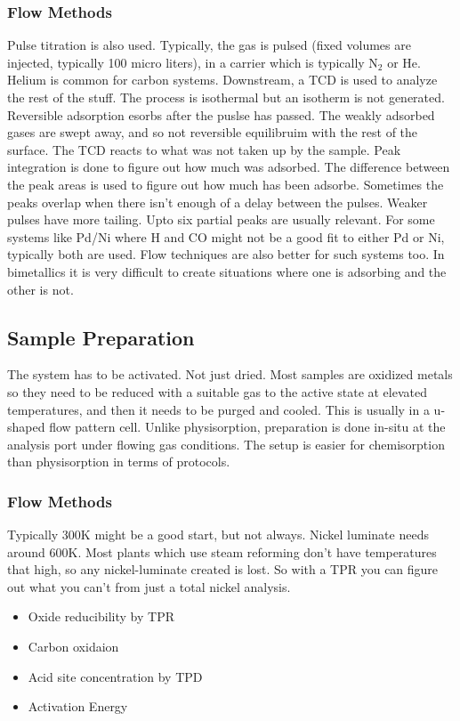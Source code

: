 \documentclass[12pt,a4paper,oneside,headinclude]{scrartcl}
\numberwithin{figure}{section}
\numberwithin{equation}{section}
\numberwithin{table}{section}
\begin{document}
\subsubsection{Flow Methods}
\label{sec:orgdb6e22e}
Pulse titration is also used. Typically, the gas is pulsed (fixed volumes are
injected, typically 100 micro liters), in a carrier which is typically N\(_{\text{2}}\) or
He. Helium is common for carbon systems. Downstream, a TCD is used to analyze
the rest of the stuff. The process is isothermal but an isotherm is not
generated. Reversible adsorption esorbs after the puslse has passed. The weakly
adsorbed gases are swept away, and so not reversible equilibruim with the rest
of the surface. The TCD reacts to what was not taken up by the sample. Peak
integration is done to figure out how much was adsorbed. The difference between
the peak areas is used to figure out how much has been adsorbe. Sometimes the
peaks overlap when there isn't enough of a delay between the pulses. Weaker
pulses have more tailing. Upto six partial peaks are usually relevant.
For some systems like Pd/Ni where H and CO might not be a good fit to either Pd
or Ni, typically both are used. Flow techniques are also better for such systems
too. In bimetallics it is very difficult to create situations where one is
adsorbing and the other is not.
\subsection{Sample Preparation}
\label{sec:org749e52e}
The system has to be activated. Not just dried. Most samples are oxidized metals
so they need to be reduced with a suitable gas to the active state at elevated
temperatures, and then it needs to be purged and cooled. This is usually in a
u-shaped flow pattern cell. Unlike physisorption, preparation is done in-situ at
the analysis port under flowing gas conditions. The setup is easier for
chemisorption than physisorption in terms of protocols.

\subsubsection{Flow Methods}
\label{sec:org8de5b1a}
Typically 300K might be a good start, but not always. Nickel luminate needs
around 600K. Most plants which use steam reforming don't have temperatures that
high, so any nickel-luminate created is lost. So with a TPR you can figure out
what you can't from just a total nickel analysis.
\begin{itemize}
\item Oxide reducibility by TPR
\item Carbon oxidaion
\item Acid site concentration by TPD
\item Activation Energy
\end{itemize}
\end{document}
